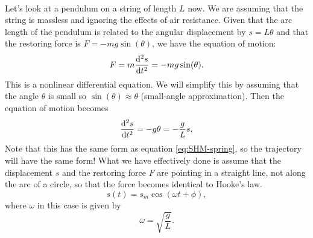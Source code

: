 \documentclass[../classical_mechanics.tex]{subfiles}
\begin{document}
        \paragraph{}
        Let's look at a pendulum on a string of length $L$ now.
        We are assuming that the string is massless and ignoring the effects of air resistance.
        Given that the arc length of the pendulum is related to the angular displacement by $s=L\theta$ and that the restoring force is $F=-mg\sin(\theta)$, we have the equation of motion:
        \begin{equation}\label{eq:SHM-pendulum-s-analytic}
            F=m\dv[2]{s}{t}=-mg\sin(\theta).
        \end{equation}
        This is a nonlinear differential equation. We will simplify this by assuming that the angle $\theta$ is small so $\sin(\theta)\approx\theta$ (small-angle approximation).
        Then the equation of motion becomes
        \begin{equation}
            \dv[2]{s}{t}=-g\theta=-\frac{g}{L}s.
        \end{equation}
        Note that this has the same form as equation \ref{eq:SHM-spring}, so the trajectory will have the same form!
        What we have effectively done is assume that the displacement $s$ and the restoring force $F$ are pointing in a straight line, not along the arc of a circle, so that the force becomes identical to Hooke's law.
        \begin{equation}
            s(t)=s_m\cos(\omega t+\phi),
        \end{equation}
        where $\omega$ in this case is given by
        \begin{equation}
            \omega=\sqrt{\frac{g}{L}}.
        \end{equation}
\end{document}
